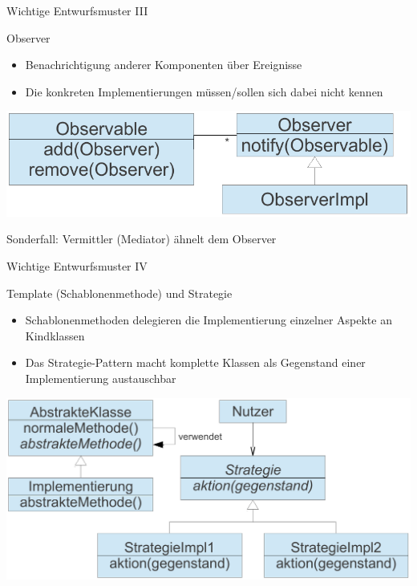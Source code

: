 \begin{frame}{Wichtige Entwurfsmuster III}
	\begin{block}{Observer}
		\begin{itemize}
			\item Benachrichtigung anderer Komponenten über Ereignisse
			\item Die konkreten Implementierungen müssen/sollen sich dabei nicht kennen
		\end{itemize}
		\vspace{-0.7em}
		\begin{center}
			\includegraphics[width=0.85\linewidth]{images/observer.pdf}
		\end{center}
		Sonderfall: Vermittler (Mediator) ähnelt dem Observer
	\end{block}
\end{frame}
	
\begin{frame}{Wichtige Entwurfsmuster IV}
	\begin{block}{Template (Schablonenmethode) und Strategie}
		\begin{itemize}
			\item Schablonenmethoden delegieren die Implementierung einzelner Aspekte an Kindklassen
			\item Das Strategie-Pattern macht komplette Klassen als Gegenstand einer Implementierung austauschbar
		\end{itemize}
		\vspace{-1em}
		\begin{center}
			\includegraphics[width=0.85\linewidth]{images/strategy.pdf}
		\end{center}
	\end{block}
\end{frame}

